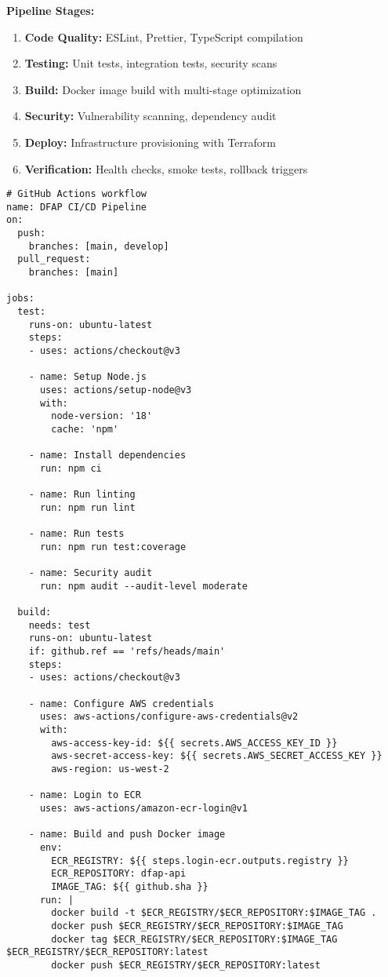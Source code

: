 \textbf{Pipeline Stages:}
\begin{enumerate}
  \item \textbf{Code Quality:} ESLint, Prettier, TypeScript compilation
  \item \textbf{Testing:} Unit tests, integration tests, security scans
  \item \textbf{Build:} Docker image build with multi-stage optimization
  \item \textbf{Security:} Vulnerability scanning, dependency audit
  \item \textbf{Deploy:} Infrastructure provisioning with Terraform
  \item \textbf{Verification:} Health checks, smoke tests, rollback triggers
\end{enumerate}

\begin{verbatim}
# GitHub Actions workflow
name: DFAP CI/CD Pipeline
on:
  push:
    branches: [main, develop]
  pull_request:
    branches: [main]

jobs:
  test:
    runs-on: ubuntu-latest
    steps:
    - uses: actions/checkout@v3
    
    - name: Setup Node.js
      uses: actions/setup-node@v3
      with:
        node-version: '18'
        cache: 'npm'
    
    - name: Install dependencies
      run: npm ci
    
    - name: Run linting
      run: npm run lint
    
    - name: Run tests
      run: npm run test:coverage
    
    - name: Security audit
      run: npm audit --audit-level moderate

  build:
    needs: test
    runs-on: ubuntu-latest
    if: github.ref == 'refs/heads/main'
    steps:
    - uses: actions/checkout@v3
    
    - name: Configure AWS credentials
      uses: aws-actions/configure-aws-credentials@v2
      with:
        aws-access-key-id: ${{ secrets.AWS_ACCESS_KEY_ID }}
        aws-secret-access-key: ${{ secrets.AWS_SECRET_ACCESS_KEY }}
        aws-region: us-west-2
    
    - name: Login to ECR
      uses: aws-actions/amazon-ecr-login@v1
    
    - name: Build and push Docker image
      env:
        ECR_REGISTRY: ${{ steps.login-ecr.outputs.registry }}
        ECR_REPOSITORY: dfap-api
        IMAGE_TAG: ${{ github.sha }}
      run: |
        docker build -t $ECR_REGISTRY/$ECR_REPOSITORY:$IMAGE_TAG .
        docker push $ECR_REGISTRY/$ECR_REPOSITORY:$IMAGE_TAG
        docker tag $ECR_REGISTRY/$ECR_REPOSITORY:$IMAGE_TAG $ECR_REGISTRY/$ECR_REPOSITORY:latest
        docker push $ECR_REGISTRY/$ECR_REPOSITORY:latest


\end{verbatim}
